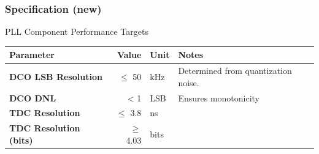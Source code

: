 \documentclass[t, screen, aspectratio=43]{beamer}
\begin{document}
\begin{frame}
	\frametitle{Specification (new)}
	\begin{block}{PLL Component Performance Targets}
		\scriptsize
		\begin{table}[h!]
			\centering
			\def\arraystretch{1.5}		
			\setlength\arrayrulewidth{0.75pt}
			\setlength{\tabcolsep}{1em} %
			\begin{tabular}{|l|r|l|l|}
				\hline 
				\rule[-1ex]{0pt}{2.5ex} \cellcolor{gray!40}\textbf{Parameter} & \cellcolor{gray!40}\textbf{Value} & \cellcolor{gray!40}\textbf{Unit }& \cellcolor{gray!40}\textbf{Notes}\\ 
				\hline 
				\rule[-1ex]{0pt}{2.5ex} \textbf{DCO LSB Resolution}  & $\leq$ 50  & kHz & Determined from quantization noise.\\ 
				\hline 
				\rule[-1ex]{0pt}{2.5ex} \textbf{DCO DNL} & < 1 & LSB & Ensures monotonicity \\ 
				\hline 
				\rule[-1ex]{0pt}{2.5ex} \textbf{TDC Resolution} & $\leq$ 3.8  & ns & \\ 
				\hline 
				\rule[-1ex]{0pt}{2.5ex} \textbf{TDC Resolution (bits)} & $\geq$ 4.03 &bits & \\ 
				\hline 
			\end{tabular} 
		\end{table}   
	\end{block}    
\end{frame}

\end{document}
